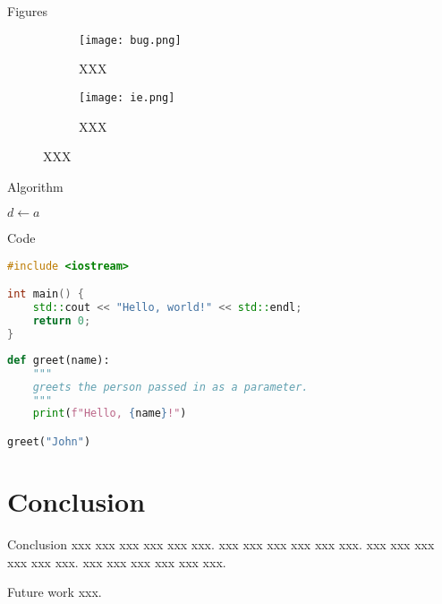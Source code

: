 \documentclass[compress,aspectratio=43]{beamer}
\begin{document}
\begin{frame}{Figures}
    \begin{figure}[htbp]
        \centering
        \begin{subfigure}[b]{0.47\textwidth}
            \centering
            \texttt{[image: bug.png]}
            \caption{XXX}
            \label{fig:subfig-a}
        \end{subfigure}
        \begin{subfigure}[b]{0.47\textwidth}
            \centering
            \texttt{[image: ie.png]}
            \caption{XXX}
            \label{fig:subfig-b}
        \end{subfigure}
        \caption{XXX}
        \label{fig:example}
    \end{figure}
\end{frame}

\begin{frame}{Algorithm}
    \begin{algorithm}[H]
        \caption{Euclid's algorithm}
        $d \leftarrow a$\;
    \end{algorithm}

\end{frame}

\begin{frame}[fragile]{Code}

    \begin{lstlisting}[language=c++]
#include <iostream>

int main() {
    std::cout << "Hello, world!" << std::endl;
    return 0;
}
\end{lstlisting}

    \begin{lstlisting}[language=python]
def greet(name):
    """
    greets the person passed in as a parameter.
    """
    print(f"Hello, {name}!")

greet("John")
\end{lstlisting}

\end{frame}


\section{Conclusion}

\begin{frame}{Conclusion}
    xxx xxx xxx xxx xxx xxx.
    xxx xxx xxx xxx xxx xxx.
    xxx xxx xxx xxx xxx xxx.
    xxx xxx xxx xxx xxx xxx.
\end{frame}

\begin{frame}{Future work}
    xxx.
\end{frame}
\end{document}
